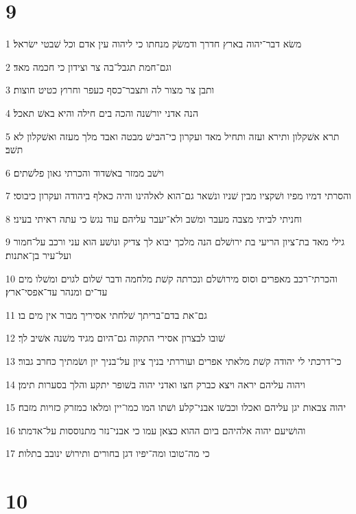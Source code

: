 \chapter{9}

\par 1 משׂא דבר־יהוה בארץ חדרך ודמשׂק מנחתו כי ליהוה עין אדם וכל שׁבטי ישׂראל׃
\par 2 וגם־חמת תגבל־בה צר וצידון כי חכמה מאד׃
\par 3 ותבן צר מצור לה ותצבר־כסף כעפר וחרוץ כטיט חוצות׃
\par 4 הנה אדני יורשׁנה והכה בים חילה והיא באשׁ תאכל׃
\par 5 תרא אשׁקלון ותירא ועזה ותחיל מאד ועקרון כי־הבישׁ מבטה ואבד מלך מעזה ואשׁקלון לא תשׁב׃
\par 6 וישׁב ממזר באשׁדוד והכרתי גאון פלשׁתים׃
\par 7 והסרתי דמיו מפיו ושׁקציו מבין שׁניו ונשׁאר גם־הוא לאלהינו והיה כאלף ביהודה ועקרון כיבוסי׃
\par 8 וחניתי לביתי מצבה מעבר ומשׁב ולא־יעבר עליהם עוד נגשׂ כי עתה ראיתי בעיני׃
\par 9 גילי מאד בת־ציון הריעי בת ירושׁלם הנה מלכך יבוא לך צדיק ונושׁע הוא עני ורכב על־חמור ועל־עיר בן־אתנות׃
\par 10 והכרתי־רכב מאפרים וסוס מירושׁלם ונכרתה קשׁת מלחמה ודבר שׁלום לגוים ומשׁלו מים עד־ים ומנהר עד־אפסי־ארץ׃
\par 11 גם־את בדם־בריתך שׁלחתי אסיריך מבור אין מים בו׃
\par 12 שׁובו לבצרון אסירי התקוה גם־היום מגיד משׁנה אשׁיב לך׃
\par 13 כי־דרכתי לי יהודה קשׁת מלאתי אפרים ועוררתי בניך ציון על־בניך יון ושׂמתיך כחרב גבור׃
\par 14 ויהוה עליהם יראה ויצא כברק חצו ואדני יהוה בשׁופר יתקע והלך בסערות תימן׃
\par 15 יהוה צבאות יגן עליהם ואכלו וכבשׁו אבני־קלע ושׁתו המו כמו־יין ומלאו כמזרק כזויות מזבח׃
\par 16 והושׁיעם יהוה אלהיהם ביום ההוא כצאן עמו כי אבני־נזר מתנוססות על־אדמתו׃
\par 17 כי מה־טובו ומה־יפיו דגן בחורים ותירושׁ ינובב בתלות׃

\chapter{10}

